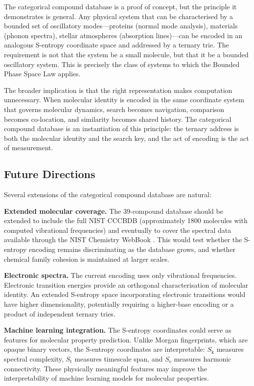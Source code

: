 \documentclass[11pt,twocolumn,a4paper]{article}
\theoremstyle{definition}
\theoremstyle{remark}
\newcommand{\Sk}{S_{\mathrm{k}}}
\newcommand{\St}{S_{\mathrm{t}}}
\newcommand{\Se}{S_{\mathrm{e}}}
\begin{document}
The categorical compound database is a proof of concept, but the principle it demonstrates is general. Any physical system that can be characterised by a bounded set of oscillatory modes---proteins (normal mode analysis), materials (phonon spectra), stellar atmospheres (absorption lines)---can be encoded in an analogous S-entropy coordinate space and addressed by a ternary trie. The requirement is not that the system be a small molecule, but that it be a bounded oscillatory system. This is precisely the class of systems to which the Bounded Phase Space Law applies.

The broader implication is that the right representation makes computation unnecessary. When molecular identity is encoded in the same coordinate system that governs molecular dynamics, search becomes navigation, comparison becomes co-location, and similarity becomes shared history. The categorical compound database is an instantiation of this principle: the ternary address is both the molecular identity and the search key, and the act of encoding is the act of measurement.

\subsection{Future Directions}

Several extensions of the categorical compound database are natural:

\textbf{Extended molecular coverage.} The 39-compound database should be extended to include the full NIST CCCBDB (approximately 1800 molecules with computed vibrational frequencies) and eventually to cover the spectral data available through the NIST Chemistry WebBook \citep{linstrom2023}. This would test whether the S-entropy encoding remains discriminating as the database grows, and whether chemical family cohesion is maintained at larger scales.

\textbf{Electronic spectra.} The current encoding uses only vibrational frequencies. Electronic transition energies provide an orthogonal characterisation of molecular identity. An extended S-entropy space incorporating electronic transitions would have higher dimensionality, potentially requiring a higher-base encoding or a product of independent ternary tries.

\textbf{Machine learning integration.} The S-entropy coordinates could serve as features for molecular property prediction. Unlike Morgan fingerprints, which are opaque binary vectors, the S-entropy coordinates are interpretable: $\Sk$ measures spectral complexity, $\St$ measures timescale span, and $\Se$ measures harmonic connectivity. These physically meaningful features may improve the interpretability of machine learning models for molecular properties.
\end{document}
